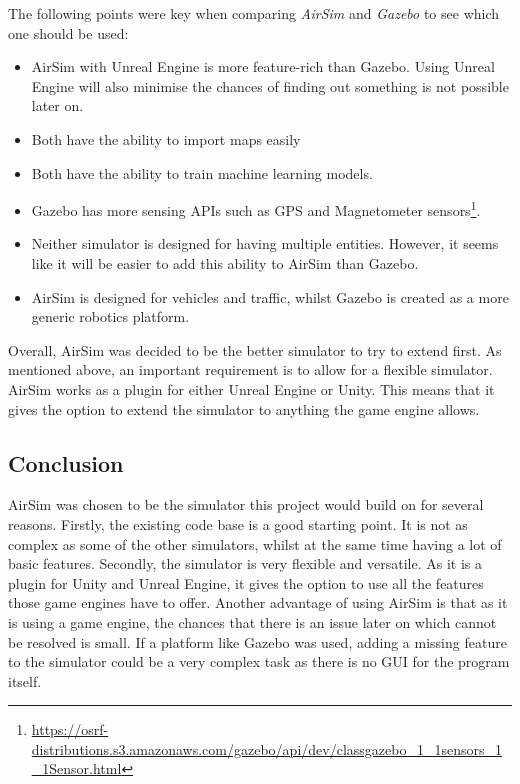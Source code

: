 The following points were key when comparing \emph{AirSim} and \emph{Gazebo} to see which one should be used:
\begin{itemize}
    \item AirSim with Unreal Engine is more feature-rich than Gazebo. Using Unreal Engine will also minimise the chances of finding out something is not possible later on.
    \item Both have the ability to import maps easily
    \item Both have the ability to train machine learning models.
    \item Gazebo has more sensing APIs such as GPS and Magnetometer sensors\footnote{\url{https://osrf-distributions.s3.amazonaws.com/gazebo/api/dev/classgazebo_1_1sensors_1_1Sensor.html}}.
    \item Neither simulator is designed for having multiple entities. However, it seems like it will be easier to add this ability to AirSim than Gazebo. 
    \item AirSim is designed for vehicles and traffic, whilst Gazebo is created as a more generic robotics platform. 
\end{itemize}

Overall, AirSim was decided to be the better simulator to try to extend first. As mentioned above, an important requirement is to allow for a flexible simulator. AirSim works as a plugin for either Unreal Engine or Unity. This means that it gives the option to extend the simulator to anything the game engine allows. 

\subsection{Conclusion}
AirSim was chosen to be the simulator this project would build on for several reasons. Firstly, the existing code base is a good starting point. It is not as complex as some of the other simulators, whilst at the same time having a lot of basic features. Secondly, the simulator is very flexible and versatile. As it is a plugin for Unity and Unreal Engine, it gives the option to use all the features those game engines have to offer. Another advantage of using AirSim is that as it is using a game engine, the chances that there is an issue later on which cannot be resolved is small. If a platform like Gazebo was used, adding a missing feature to the simulator could be a very complex task as there is no GUI for the program itself. 


